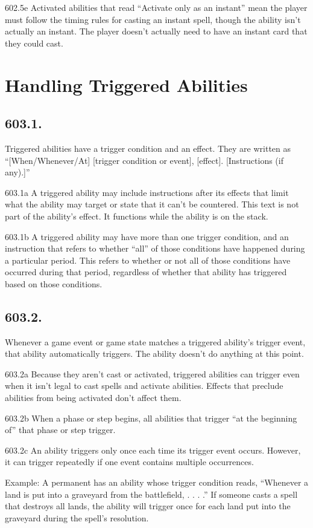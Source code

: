 602.5e Activated abilities that read “Activate only as an instant” mean the player must follow the timing rules for casting an instant spell, though the ability isn’t actually an instant. The player doesn’t actually need to have an instant card that they could cast.

\section{Handling Triggered Abilities}
\subsection*{603.1.}
Triggered abilities have a trigger condition and an effect. They are written as “[When/Whenever/At] [trigger condition or event], [effect]. [Instructions (if any).]”

603.1a A triggered ability may include instructions after its effects that limit what the ability may target or state that it can’t be countered. This text is not part of the ability’s effect. It functions while the ability is on the stack.

603.1b A triggered ability may have more than one trigger condition, and an instruction that refers to whether “all” of those conditions have happened during a particular period. This refers to whether or not all of those conditions have occurred during that period, regardless of whether that ability has triggered based on those conditions.

\subsection*{603.2.}
Whenever a game event or game state matches a triggered ability’s trigger event, that ability automatically triggers. The ability doesn’t do anything at this point.

603.2a Because they aren’t cast or activated, triggered abilities can trigger even when it isn’t legal to cast spells and activate abilities. Effects that preclude abilities from being activated don’t affect them.

603.2b When a phase or step begins, all abilities that trigger “at the beginning of” that phase or step trigger.

603.2c An ability triggers only once each time its trigger event occurs. However, it can trigger repeatedly if one event contains multiple occurrences.

Example: A permanent has an ability whose trigger condition reads, “Whenever a land is put into a graveyard from the battlefield, . . . .” If someone casts a spell that destroys all lands, the ability will trigger once for each land put into the graveyard during the spell’s resolution.


